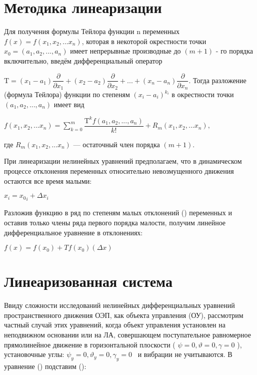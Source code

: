 \section{Методика линеаризации} \label{ch:ch3/linerization}

\cite[]{tailor}

Для получения формулы Тейлора функции n переменных $f(x) = f(x_1, x_2, ... x_n)$, которая в некоторой окрестности точки  
$ x_0 = (a_{1},a_{2},...,a_{n})$ имеет непрерывные производные до  $(m+1)$ - го порядка включительно, введём дифференциальный оператор

$ \mathrm {T} =(x_{1}-a_{1}){\dfrac {\partial }{\partial x_{1}}}+(x_{2}-a_{2}){\dfrac {\partial }{\partial x_{2}}}+...+(x_{n}-a_{n}){\dfrac {\partial }{\partial x_{n}}}.$ 
Тогда разложение (формула Тейлора) функции по степеням  $ (x_{i}-a_{i})^{k_{i}}$ в окрестности точки   $(a_{1},a_{2},...,a_{n})$ имеет вид

 $ f(x_{1},x_{2},...x_{n})=\sum \limits _{k=0}^{m}{\dfrac {\mathrm {T} ^{k}f(a_{1},a_{2},...,a_{n})}{k!}}+R_{m}(x_{1},x_{2},...x_{n}),$
 
где $ R_m(x_1, x_2, ... x_n)$ — остаточный член порядка $(m+1)$.

При линеаризации нелинейных уравнений предполагаем, что в динамическом процессе отклонения переменных относительно невозмущенного движения остаются все время малыми:

$x_i = {x_0}_i + \Delta x_i$

Разложив функцию в ряд по степеням малых отклонений () переменных и оставив только члены ряда первого порядка малости, получим линейное дифференциальное уравнение в отклонениях:

$ f(x) = f(x_0) + T f(x_0) (\Delta x)$

\section{Линеаризованная система} \label{ch:ch3/sect10}

Ввиду сложности исследований нелинейных дифференциальных уравнений пространственного движения ОЭП, как объекта управления (ОУ), рассмотрим частный случай этих уравнений, когда объект управления установлен на неподвижном основании или на ЛА, совершающем поступательное равномерное прямолинейное движение в горизонтальной плоскости ( \( \psi =0, \vartheta =0, \gamma =0 \) ), установочные углы: \( \psi _{y}=0, \vartheta _{y}=0, \gamma _{y}=0 \) \ и вибрации не учитываются. В уравнение () подставим ():


